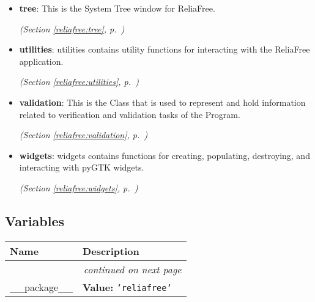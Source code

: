 \begin{itemize}
\begin{itemize}
  \end{itemize}
\item \textbf{tree}: This is the System Tree window for ReliaFree.



  \textit{(Section \ref{reliafree:tree}, p.~\pageref{reliafree:tree})}

\item \textbf{utilities}: utilities contains utility functions for interacting with the ReliaFree 
application.



  \textit{(Section \ref{reliafree:utilities}, p.~\pageref{reliafree:utilities})}

\item \textbf{validation}: This is the Class that is used to represent and hold information related to
verification and validation tasks of the Program.



  \textit{(Section \ref{reliafree:validation}, p.~\pageref{reliafree:validation})}

\item \textbf{widgets}: widgets contains functions for creating, populating, destroying, and 
interacting with pyGTK widgets.



  \textit{(Section \ref{reliafree:widgets}, p.~\pageref{reliafree:widgets})}

\end{itemize}



  \subsection{Variables}

    \vspace{-1cm}
\hspace{\varindent}\begin{longtable}{|p{\varnamewidth}|p{\vardescrwidth}|l}
\cline{1-2}
\cline{1-2} \centering \textbf{Name} & \centering \textbf{Description}& \\
\cline{1-2}
\endhead\cline{1-2}\multicolumn{3}{r}{\small\textit{continued on next page}}\\\endfoot\cline{1-2}
\endlastfoot\raggedright \_\-\_\-p\-a\-c\-k\-a\-g\-e\-\_\-\_\- & \raggedright \textbf{Value:} 
{\tt \texttt{'}\texttt{reliafree}\texttt{'}}&\\
\cline{1-2}
\end{longtable}

